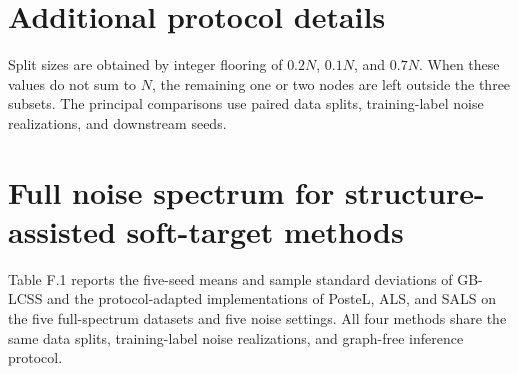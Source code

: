 \documentclass[10pt,letterpaper]{elsarticle}
\begin{document}
\FloatBarrier
\setcounter{table}{0}
\section{Additional protocol details}\label{sec:E}

Split sizes are obtained by integer flooring of \(0.2N\), \(0.1N\), and \(0.7N\). When these values do not sum to \(N\), the remaining one or two nodes are left outside the three subsets. The principal comparisons use paired data splits, training-label noise realizations, and downstream seeds.

\FloatBarrier
\setcounter{table}{0}
\section{Full noise spectrum for structure-assisted soft-target methods}\label{sec:F}

Table F.1 reports the five-seed means and sample standard deviations of GB-LCSS and the protocol-adapted implementations of PosteL, ALS, and SALS on the five full-spectrum datasets and five noise settings. All four methods share the same data splits, training-label noise realizations, and graph-free inference protocol.
\end{document}
